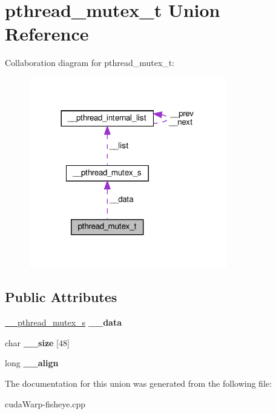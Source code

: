 \hypertarget{unionpthread__mutex__t}{}\section{pthread\+\_\+mutex\+\_\+t Union Reference}
\label{unionpthread__mutex__t}


Collaboration diagram for pthread\+\_\+mutex\+\_\+t\+:\nopagebreak
\begin{figure}[H]
\begin{center}
\leavevmode
\includegraphics[width=245pt]{unionpthread__mutex__t__coll__graph}
\end{center}
\end{figure}
\subsection*{Public Attributes}
\begin{DoxyCompactItemize}
\item 
\hyperlink{struct____pthread__mutex__s}{\+\_\+\+\_\+pthread\+\_\+mutex\+\_\+s} {\bfseries \+\_\+\+\_\+data}\hypertarget{unionpthread__mutex__t_a57a1cbe54fed60920c70bf9aeb9db155}{}\label{unionpthread__mutex__t_a57a1cbe54fed60920c70bf9aeb9db155}

\item 
char {\bfseries \+\_\+\+\_\+size} \mbox{[}48\mbox{]}\hypertarget{unionpthread__mutex__t_ae33b5c8d18472dc3d2573cfe779976f3}{}\label{unionpthread__mutex__t_ae33b5c8d18472dc3d2573cfe779976f3}

\item 
long {\bfseries \+\_\+\+\_\+align}\hypertarget{unionpthread__mutex__t_a29a79ee8c77954d34e7ee4a30f421b82}{}\label{unionpthread__mutex__t_a29a79ee8c77954d34e7ee4a30f421b82}

\end{DoxyCompactItemize}


The documentation for this union was generated from the following file\+:\begin{DoxyCompactItemize}
\item 
cuda\+Warp-\/fisheye.\+cpp\end{DoxyCompactItemize}
